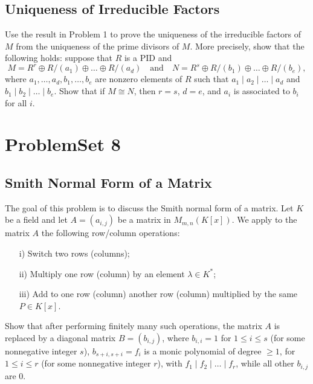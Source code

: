 \documentclass[lang=cn,11pt]{template}
\begin{document}
\section{Uniqueness of Irreducible Factors}
Use the result in Problem 1 to prove the uniqueness of the irreducible factors of \( M \) from the uniqueness of the prime divisors of \( M \). More precisely, show that the following holds: suppose that \( R \) is a PID and
\[
M = R^r \oplus R/(a_1) \oplus \dots \oplus R/(a_d) \quad \text{and} \quad N = R^s \oplus R/(b_1) \oplus \dots \oplus R/(b_e),
\]
where \( a_1, \dots, a_d, b_1, \dots, b_e \) are nonzero elements of \( R \) such that \( a_1 \mid a_2 \mid \dots \mid a_d \) and \( b_1 \mid b_2 \mid \dots \mid b_e \). Show that if \( M \cong N \), then \( r = s \), \( d = e \), and \( a_i \) is associated to \( b_i \) for all \( i \).








\chapter{ProblemSet 8}

\section{Smith Normal Form of a Matrix}
The goal of this problem is to discuss the Smith normal form of a matrix. Let \( K \) be a field and let \( A = (a_{i,j}) \) be a matrix in \( M_{m,n}(K[x]) \). We apply to the matrix \( A \) the following row/column operations:
\begin{itemize}
    \item[i)] Switch two rows (columns);
    \item[ii)] Multiply one row (column) by an element \( \lambda \in K^* \);
    \item[iii)] Add to one row (column) another row (column) multiplied by the same \( P \in K[x] \).
\end{itemize}
Show that after performing finitely many such operations, the matrix \( A \) is replaced by a diagonal matrix \( B = (b_{i,j}) \), where \( b_{i,i} = 1 \) for \( 1 \leq i \leq s \) (for some nonnegative integer \( s \)), \( b_{s+i,s+i} = f_i \) is a monic polynomial of degree \( \geq 1 \), for \( 1 \leq i \leq r \) (for some nonnegative integer \( r \)), with \( f_1 \mid f_2 \mid \dots \mid f_r \), while all other \( b_{i,j} \) are 0.
\end{document}
